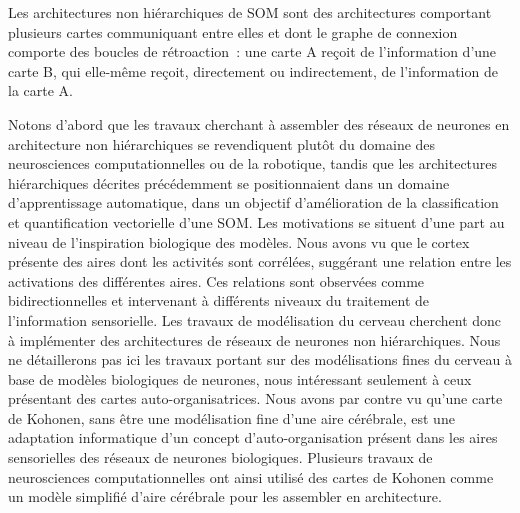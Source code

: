 \documentclass[../main]{subfiles}
\begin{document}
Les architectures non hiérarchiques de SOM sont des architectures comportant plusieurs cartes communiquant entre elles et dont le graphe de connexion comporte des boucles de rétroaction~: une carte A reçoit de l'information d'une carte B, qui elle-même reçoit, directement ou indirectement, de l'information de la carte A.

Notons d'abord que les travaux cherchant à assembler des réseaux de neurones en architecture non hiérarchiques se revendiquent plutôt du domaine des neurosciences computationnelles ou de la robotique, tandis que les architectures hiérarchiques décrites précédemment se positionnaient dans un domaine d'apprentissage automatique, dans un objectif d'amélioration de la classification et quantification vectorielle d'une SOM.
Les motivations se situent d'une part au niveau de l'inspiration biologique des modèles. 
Nous avons vu que le cortex présente des aires dont les activités sont corrélées, suggérant une relation entre les activations des différentes aires. Ces relations sont observées comme bidirectionnelles et intervenant à différents niveaux du traitement de l'information sensorielle.
Les travaux de modélisation du cerveau cherchent donc à implémenter des architectures de réseaux de neurones non hiérarchiques. 
Nous ne détaillerons pas ici les travaux portant sur des modélisations fines du cerveau à base de modèles biologiques de neurones, nous intéressant seulement à ceux présentant des cartes auto-organisatrices.
Nous avons par contre vu qu'une carte de Kohonen, sans être une modélisation fine d'une aire cérébrale, est une adaptation informatique d'un concept d'auto-organisation présent dans les aires sensorielles des réseaux de neurones biologiques. Plusieurs travaux de neurosciences computationnelles ont ainsi utilisé des cartes de Kohonen comme un modèle simplifié d'aire cérébrale pour les assembler en architecture.
\end{document}
